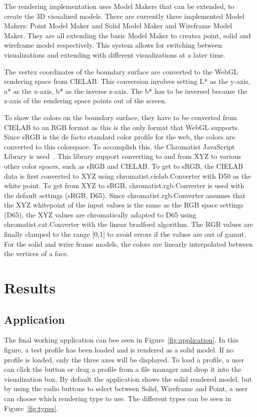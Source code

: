 The rendering implementation uses Model Makers that can be extended, to create the 3D visualized models.
There are currently three implemented Model Makers: Point Model Maker and Solid Model Maker and Wireframe Model Maker.
They are all extending the basic Model Maker to createa point, solid and wireframe model respectively.
This system allows for switching between visualizations and extending with different visualizations at a later time.

The vertex coordinates of the boundary surface are converted to the WebGL rendering space from CIELAB.
This conversion involves setting L* as the y-axis, a* as the x-axis, b* as the inverse z-axis.
The b* has to be inversed because the z-axis of the rendering space points out of the screen.

To show the colors on the boundary surface, they have to be converted from CIELAB to an RGB format as this is the only format that WebGL supports.
Since sRGB is the de facto standard color profile for the web, the colors are converted to this colorspace.
To accomplish this, the Chromatist JavaScript Library is used~\cite{Chromatist}.
This library support converting to and from XYZ to various other color spaces, such as sRGB and CIELAB.
To get to sRGB, the CIELAB data is first converted to XYZ using chromatist.cielab.Converter with D50 as the white point.
To get from XYZ to sRGB, chromatist.rgb.Converter is used with the default settings (sRGB, D65).
Since chromatist.rgb.Converter assumes that the XYZ whitepoint of the input values is the same as the RGB space settings (D65), the XYZ values are chromatically adapted to D65 using chromatist.cat.Converter with the linear bradford algorithm.
The RGB values are finally clamped to the range [0,1] to avoid errors if the values are out of gamut.
For the solid and wrire frame models, the colors are linearly interpolated between the vertices of a face.

\section{Results}

\subsection{Application}
The final working application can bee seen in Figure~\ref{fig:application}.
In this figure, a test profile has been loaded and is rendered as a solid model.
If no profile is loaded, only the three axes will be displayed.
To load a profile, a user can click the  button or drag a profile from a file manager and drop it into the visualization box.
By default the application shows the solid rendered model, but by using the radio buttons to select between Solid, Wireframe and Point, a user can choose which rendering type to use.
The different types can be seen in Figure~\ref{fig:types}.

